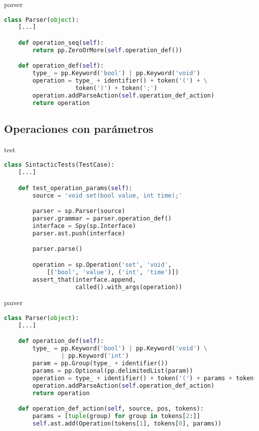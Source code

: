\documentclass[11pt]{beamer}
\begin{document}
\begin{frame}[fragile]{parser}
\begin{lstlisting}[language=Python]
class Parser(object):
    [...]

    def operation_seq(self):
        return pp.ZeroOrMore(self.operation_def())

    def operation_def(self):
        type_ = pp.Keyword('bool') | pp.Keyword('void')
        operation = type_ + identifier() + token('(') + \
                    token(')') + token(';')
        operation.addParseAction(self.operation_def_action)
        return operation
\end{lstlisting}
\end{frame}


\subsection{Operaciones con parámetros}

\begin{frame}[fragile]{test}
\begin{lstlisting}[language=Python]
class SintacticTests(TestCase):
    [...]

    def test_operation_params(self):
        source = 'void set(bool value, int time);'

        parser = sp.Parser(source)
        parser.grammar = parser.operation_def()
        interface = Spy(sp.Interface)
        parser.ast.push(interface)

        parser.parse()

        operation = sp.Operation('set', 'void',
            [('bool', 'value'), ('int', 'time')])
        assert_that(interface.append,
                    called().with_args(operation))
\end{lstlisting}
\end{frame}


\begin{frame}[fragile]{parser}
\begin{lstlisting}[language=Python]
class Parser(object):
    [...]

    def operation_def(self):
        type_ = pp.Keyword('bool') | pp.Keyword('void') \
                | pp.Keyword('int')
        param = pp.Group(type_ + identifier())
        params = pp.Optional(pp.delimitedList(param))
        operation = type_ + identifier() + token('(') + params + token(')') + token(';')
        operation.addParseAction(self.operation_def_action)
        return operation

    def operation_def_action(self, source, pos, tokens):
        params = [tuple(group) for group in tokens[2:]]
        self.ast.add(Operation(tokens[1], tokens[0], params))
\end{lstlisting}
\end{frame}
\end{document}
